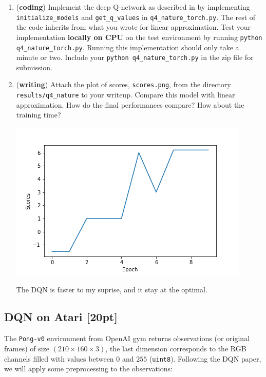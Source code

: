 \documentclass[11pt]{article}
\theoremstyle{case}
\begin{document}
\begin{enumerate}[label=(\alph*)]
    \item ({\bf coding}) Implement the deep Q-network as described in by implementing \texttt{initialize\_models} and \texttt{get\_q\_values} in \texttt{q4\_nature\_torch.py}. The rest of the code inherits from what you wrote for linear approximation. Test your implementation \textbf{locally on CPU} on the test environment by running \texttt{python q4\_nature\_torch.py}.  Running this implementation should only take a minute or two.
    Include your \texttt{python q4\_nature\_torch.py} in the zip file for submission.
    
    \item ({\bf writing}) Attach the plot of scores, \texttt{scores.png}, from the directory \texttt{results/q4\_nature} to your writeup. Compare this model with linear approximation. How do the final performances compare? How about the training time?
    \begin{shaded}
    \begin{minipage}{1\linewidth}\centering
	\includegraphics[width=0.80\linewidth]{./starter_code_torch/results/q4_nature/scores.png}
	\end{minipage}
    \end{shaded}
	The DQN is faster to my suprise, and it stay at the optimal.
\end{enumerate}

\newpage

\subsection{DQN on Atari [20pt]} 
The \texttt{Pong-v0} environment from OpenAI gym returns observations (or original frames) of size $ (210 \times 160 \times 3) $, the last dimension corresponds to the RGB channels filled with values between $ 0 $ and $ 255 $ (\texttt{uint8}). Following the DQN paper, we will apply some preprocessing to the observations:
\end{document}
